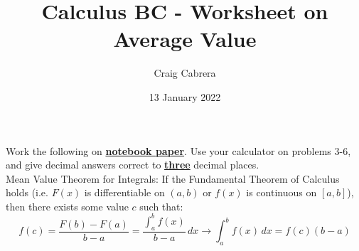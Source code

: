 \documentclass[10pt, letterpaper]{report}
\title{Calculus BC - Worksheet on Average Value}
\author{Craig Cabrera}
\date{13 January 2022}
\begin{document}
\maketitle
\noindent Work the following on \textbf{\underline{notebook paper}}. Use your calculator on problems 3-6, and give decimal answers correct to \textbf{\underline{three}} decimal places. \\

\noindent Mean Value Theorem for Integrals: If the Fundamental Theorem of Calculus holds (i.e. $F(x)$ is differentiable on $(a,b)$ or $f(x)$ is continuous on $[a,b]$), then there exists some value $c$ such that: \\

\[f(c)=\frac{F(b)-F(a)}{b-a}=\frac{\int_{a}^{b}{f(x)}}{b-a}\,dx\rightarrow\int_{a}^{b}{f(x)}\,dx=f(c)(b-a)\]
\end{document}
